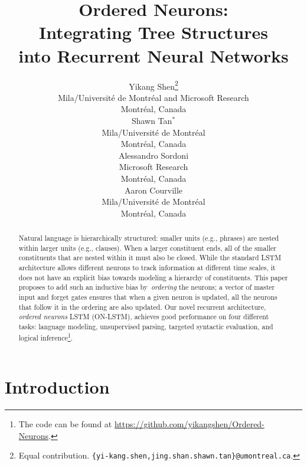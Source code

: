 \documentclass{article} \usepackage{iclr2019_conference,times}
\title{Ordered Neurons: \\ Integrating Tree Structures \\ into Recurrent Neural Networks}
\author{Yikang Shen\thanks{Equal contribution. \texttt{\{yi-kang.shen,jing.shan.shawn.tan\}@umontreal.ca}.}\\
Mila/Universit\'e de Montr\'eal and Microsoft Research \\
Montr\'eal, Canada \\
\And
Shawn Tan$^{*}$\\
Mila/Universit\'e de Montr\'eal \\
Montr\'eal, Canada \\
\AND
Alessandro Sordoni \\
Microsoft Research \\
Montr\'eal, Canada \\
\And
Aaron Courville \\
Mila/Universit\'e de Montr\'eal \\
Montr\'eal, Canada \\
}
\begin{document}
\maketitle

\begin{abstract}
Natural language is hierarchically structured: smaller units (e.g., phrases) are nested within larger units (e.g., clauses). When a larger constituent ends, all of the smaller constituents that are nested within it must also be closed. While the standard LSTM architecture allows different neurons to track information at different time scales, it does not have an explicit bias towards modeling a hierarchy of constituents. This paper proposes to add such an inductive bias by~\emph{ordering} the neurons; a vector of master input and forget gates ensures that when a given neuron is updated, all the neurons that follow it in the ordering are also updated. Our novel recurrent architecture, \emph{ordered neurons} LSTM (ON-LSTM), achieves good performance on four different tasks: language modeling, unsupervised parsing, targeted syntactic evaluation, and logical inference\footnote{The code can be found at \url{https://github.com/yikangshen/Ordered-Neurons}.}.
\end{abstract}

\section{Introduction}
\end{document}
